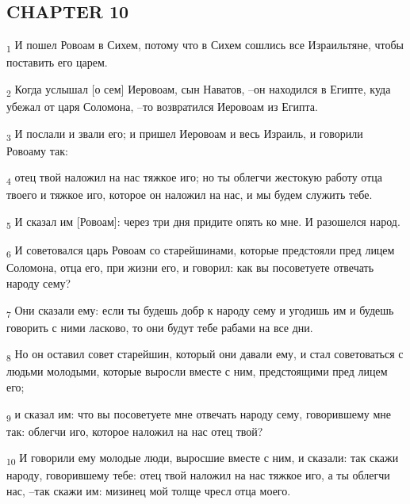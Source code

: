 \subsection{CHAPTER 10}
\begin{tcolorbox}
\textsubscript{1} И пошел Ровоам в Сихем, потому что в Сихем сошлись все Израильтяне, чтобы поставить его царем.
\end{tcolorbox}
\begin{tcolorbox}
\textsubscript{2} Когда услышал [о сем] Иеровоам, сын Наватов, --он находился в Египте, куда убежал от царя Соломона, --то возвратился Иеровоам из Египта.
\end{tcolorbox}
\begin{tcolorbox}
\textsubscript{3} И послали и звали его; и пришел Иеровоам и весь Израиль, и говорили Ровоаму так:
\end{tcolorbox}
\begin{tcolorbox}
\textsubscript{4} отец твой наложил на нас тяжкое иго; но ты облегчи жестокую работу отца твоего и тяжкое иго, которое он наложил на нас, и мы будем служить тебе.
\end{tcolorbox}
\begin{tcolorbox}
\textsubscript{5} И сказал им [Ровоам]: через три дня придите опять ко мне. И разошелся народ.
\end{tcolorbox}
\begin{tcolorbox}
\textsubscript{6} И советовался царь Ровоам со старейшинами, которые предстояли пред лицем Соломона, отца его, при жизни его, и говорил: как вы посоветуете отвечать народу сему?
\end{tcolorbox}
\begin{tcolorbox}
\textsubscript{7} Они сказали ему: если ты будешь добр к народу сему и угодишь им и будешь говорить с ними ласково, то они будут тебе рабами на все дни.
\end{tcolorbox}
\begin{tcolorbox}
\textsubscript{8} Но он оставил совет старейшин, который они давали ему, и стал советоваться с людьми молодыми, которые выросли вместе с ним, предстоящими пред лицем его;
\end{tcolorbox}
\begin{tcolorbox}
\textsubscript{9} и сказал им: что вы посоветуете мне отвечать народу сему, говорившему мне так: облегчи иго, которое наложил на нас отец твой?
\end{tcolorbox}
\begin{tcolorbox}
\textsubscript{10} И говорили ему молодые люди, выросшие вместе с ним, и сказали: так скажи народу, говорившему тебе: отец твой наложил на нас тяжкое иго, а ты облегчи нас, --так скажи им: мизинец мой толще чресл отца моего.
\end{tcolorbox}
